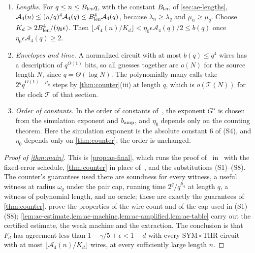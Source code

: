\documentclass[11pt,letterpaper]{article}
\theoremstyle{definition}
\theoremstyle{remark}
\newcommand{\THR}{\mathrm{THR}}
\newcommand{\SYM}{\mathrm{SYM}}
\newcommand{\Tclk}{\mathcal T}
\begin{document}
\begin{enumerate}[label=(S\arabic*)]
restrictions. They do not increase the wire count, and the restricted
circuits are normalized again after restriction, as in (S3).
\item \emph{Lengths.} For \(q\le n\le B_{\rm len}q\), with the constant
\(B_{\rm len}\) of \cref{sec:ae-lengths},
\(\mathcal A_4(n)\le(n/q)^4\mathcal A_4(q)\le B_{\rm len}^4\mathcal A_4(q)\),
because \(\lambda_n\ge\lambda_q\) and \(\mu_n\ge\mu_q\). Choose
\(K_d>2B_{\rm len}^4/(\eta_0\epsilon)\). Then
\(\lfloor\mathcal A_4(n)/K_d\rfloor<\eta_0\epsilon\mathcal A_4(q)/2\le b(q)\)
once \(\eta_0\epsilon\mathcal A_4(q)\ge2\).
\item \emph{Envelopes and time.} A normalized circuit with at most
\(b(q)\le q^4\) wires has a description of \(q^{O(1)}\) bits, so all
guesses together are \(o(N)\) for the source length \(N\), since
\(q=\Theta(\log N)\). The polynomially many calls take
\(2^qq^{O(1)-\mu_q}\) steps by \cref{thm:counter}(iii) at length \(q\),
which is \(o(\Tclk(N))\) for the clock \(\Tclk\) of that section.
\item \emph{Order of constants.} In the order of constants
of~\cite[the paragraph after Lemma~C.3]{NagCG}, the exponent \(G^\star\) is chosen from
the simulation exponent and \(b_{\rm amp}\), and \(\eta_0\) depends only
on the counting theorem. Here the simulation exponent is the absolute
constant \(6\) of (S4), and \(\eta_0\) depends only on
\cref{thm:counter}; the order is unchanged.
\end{enumerate}

\begin{proof}[Proof of \cref{thm:main}]
This is \cref{prop:ae-final}, which runs the proof
of~\cite[Theorem~1.2]{NagCG} in~\cite[Sections~11.1--11.6]{NagCG}
with the fixed-error schedule, \cref{thm:counter} in place
of~\cite[Theorem~3.1]{NagCG}, and the substitutions (S1)--(S8). The
counter's guarantees used there are soundness for every witness, a
useful witness at radius \(\omega_q\) under the pair cap, running time
\(2^q/q^{\mu_q}\) at length \(q\), a witness of polynomial length, and
no oracle; these are exactly the guarantees of \cref{thm:counter}.
 prove the properties of the wire count
and of the cap used in (S1)--(S8); \cref{lem:ae-estimate,lem:ae-machine,lem:ae-amplified,lem:ae-table}
carry out the certified estimate, the weak machine and the extraction.
The conclusion is that \(F_d\) has agreement less than
\(1-\gamma/5+\epsilon<1-d\) with every \(\SYM\circ\THR\) circuit with at
most \(\lfloor\mathcal A_4(n)/K_d\rfloor\) wires, at every sufficiently
large length \(n\).
\end{proof}
\end{document}
